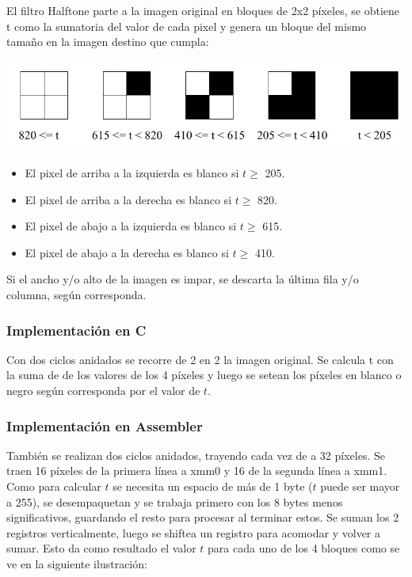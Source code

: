 El filtro Halftone parte a la imagen original en bloques de 2x2 píxeles, se obtiene t como la sumatoria del valor de cada pixel y genera un bloque del mismo tamaño en la imagen destino que cumpla:

\includegraphics[width=\textwidth]{halftone1.jpg} 

\begin{itemize}
\item El pixel de arriba a la izquierda es blanco si $t \geq$ 205.
\item El pixel de arriba a la derecha es blanco si $t \geq$ 820.
\item El pixel de abajo a la izquierda es blanco si $t \geq$ 615.
\item El pixel de abajo a la derecha es blanco si $t \geq$ 410.
\end{itemize}

Si el ancho y/o alto de la imagen es impar, se descarta la última fila y/o columna, según corresponda.

\subsubsection{Implementación en C}

Con dos ciclos anidados se recorre de 2 en 2 la imagen original.
Se calcula t con la suma de de los valores de los 4 píxeles y luego se setean los píxeles en blanco o negro según corresponda por el valor de $t$.

\subsubsection{Implementación en Assembler}

También se realizan dos ciclos anidados, trayendo cada vez de a 32 píxeles.
Se traen 16 píxeles de la primera línea a xmm0 y 16 de la segunda línea a xmm1.
Como para calcular $t$ se necesita un espacio de más de 1 byte ($t$ puede ser mayor a 255), se desempaquetan y se trabaja primero con los 8 bytes menos significativos, guardando el resto para procesar al terminar estos.
Se suman los 2 registros verticalmente, luego se shiftea un registro para acomodar y volver a sumar.
Esto da como resultado el valor $t$ para cada uno de los 4 bloques como se ve en la siguiente ilustración:

